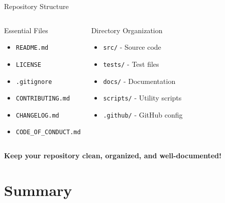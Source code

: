 \documentclass[aspectratio=169]{beamer}
\begin{document}
	\begin{frame}{Repository Structure}
		\begin{columns}[T]
			\begin{block}{Essential Files}
				\begin{itemize}
					\item \texttt{README.md}
					\item \texttt{LICENSE}
					\item \texttt{.gitignore}
					\item \texttt{CONTRIBUTING.md}
					\item \texttt{CHANGELOG.md}
					\item \texttt{CODE\_OF\_CONDUCT.md}
				\end{itemize}
			\end{block}
			
			\begin{block}{Directory Organization}
				\begin{itemize}
					\item \texttt{src/} - Source code
					\item \texttt{tests/} - Test files
					\item \texttt{docs/} - Documentation
					\item \texttt{scripts/} - Utility scripts
					\item \texttt{.github/} - GitHub config
				\end{itemize}
			\end{block}
		\end{columns}
		
		\vspace{0.3cm}
		\begin{center}
			\textbf{Keep your repository clean, organized, and well-documented!}
		\end{center}
	\end{frame}
	
	\section{Summary}
	
\end{document}
